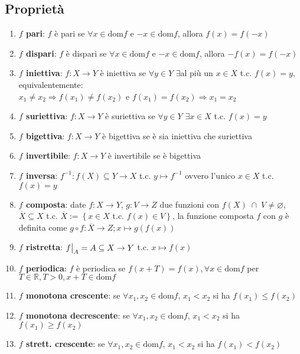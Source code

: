 \documentclass[a4paper]{article}
\newcommand\restr[2]{{%
	\left.\kern-\nulldelimiterspace %
	#1 %
	\vphantom{\big|} %
	\right|_{#2} %
	}}
\newcommand\dom{\text{dom}}
\begin{document}
\subsection*{Proprietà}
\begin{enumerate}
	\item \textbf{\(f\) pari}: \(f\) è pari se \(\forall x \in \dom f\) e \(-x \in \dom f\), allora \(f(x) = f(-x)\)
	\item \textbf{\(f\) dispari}: \(f\) è dispari se \(\forall x \in \dom f\) e \(-x \in \dom f\), allora \(-f(x) = f(-x)\)
	\item \textbf{\(f\) iniettiva}: \(f:X \to Y\) è iniettiva se \(\forall y \in Y\) \(\exists\)al più un \(x \in X\) t.c. \(f(x) = y\), equivalentemente: \\
	\(x_1 \neq x_2 \Rightarrow f(x_1) \neq f(x_2)\) e \(f(x_1) = f(x_2) \Rightarrow x_1 = x_2\)
	\item \textbf{\(f\) suriettiva}: \(f:X \to Y\) è suriettiva se \(\forall y \in Y\) \(\exists x \in X\) t.c. \(f(x) = y\)
	\item \textbf{\(f\) bigettiva}: \(f:X \to Y\) è bigettiva se è sia iniettiva che suriettiva
	\item \textbf{\(f\) invertibile}: \(f:X \to Y\) è invertibile se è bigettiva
	\item \textbf{\(f\) inversa}: \(f ^ {-1}:f(X) \subseteq Y \to X\) t.c. \(y \mapsto f ^ {-1}\) ovvero l'unico \(x \in X\) t.c. \(f(x) = y\)
	\item \textbf{\(f\) composta}: date \(f:X \to Y\), \(g:V \to Z\) due funzioni con \(f(X) \; \cap \; V \neq \varnothing\), \(\overline{X} \subseteq X\) t.c. \(\overline{X} := \left\{ x \in X \text{ t.c. } f(x) \in V \right\}\),
	la funzione composta \(f\) con \(g\) è definita come \(g \circ f : \overline{X} \to Z; x \mapsto g(f(x))\)
	\item \textbf{\(f\) ristretta}: \(\restr{f}{A} = A \subseteq X \to Y\) t.c. \(x \mapsto f(x)\)
	\item \textbf{\(f\) periodica}: \(f\) è periodica se \(f(x+T) = f(x), \forall x \in \dom f\) per \(T \in \mathbb{R}, T > 0, x + T \in \dom f\)
	\item \textbf{\(f\) monotona crescente}: se \(\forall x_1, x_2 \in \dom f\), \(x_1 < x_2\) si ha \(f(x_1) \leq f(x_2)\)
	\item \textbf{\(f\) monotona decrescente}: se \(\forall x_1, x_2 \in \dom f\), \(x_1 < x_2\) si ha \(f(x_1) \geq f(x_2)\)
	\item \textbf{\(f\) strett. crescente}: se \(\forall x_1, x_2 \in \dom f\), \(x_1 < x_2\) si ha \(f(x_1) < f(x_2)\)

\end{enumerate}
\end{document}
